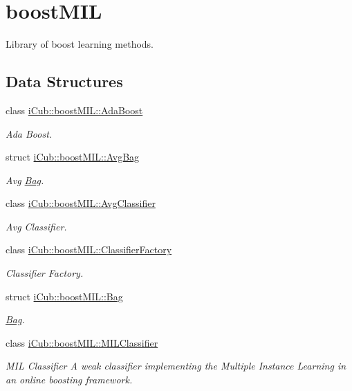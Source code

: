 \section{boost\+M\+I\+L}
\label{group__boostMIL}


Library of boost learning methods.  


\subsection*{Data Structures}
\begin{DoxyCompactItemize}
\item 
class \hyperlink{classiCub_1_1boostMIL_1_1AdaBoost}{i\+Cub\+::boost\+M\+I\+L\+::\+Ada\+Boost}
\begin{DoxyCompactList}\small\item\em Ada Boost. \end{DoxyCompactList}\item 
struct \hyperlink{structiCub_1_1boostMIL_1_1AvgBag}{i\+Cub\+::boost\+M\+I\+L\+::\+Avg\+Bag}
\begin{DoxyCompactList}\small\item\em Avg \hyperlink{structiCub_1_1boostMIL_1_1Bag}{Bag}. \end{DoxyCompactList}\item 
class \hyperlink{classiCub_1_1boostMIL_1_1AvgClassifier}{i\+Cub\+::boost\+M\+I\+L\+::\+Avg\+Classifier}
\begin{DoxyCompactList}\small\item\em Avg Classifier. \end{DoxyCompactList}\item 
class \hyperlink{classiCub_1_1boostMIL_1_1ClassifierFactory}{i\+Cub\+::boost\+M\+I\+L\+::\+Classifier\+Factory}
\begin{DoxyCompactList}\small\item\em Classifier Factory. \end{DoxyCompactList}\item 
struct \hyperlink{structiCub_1_1boostMIL_1_1Bag}{i\+Cub\+::boost\+M\+I\+L\+::\+Bag}
\begin{DoxyCompactList}\small\item\em \hyperlink{structiCub_1_1boostMIL_1_1Bag}{Bag}. \end{DoxyCompactList}\item 
class \hyperlink{classiCub_1_1boostMIL_1_1MILClassifier}{i\+Cub\+::boost\+M\+I\+L\+::\+M\+I\+L\+Classifier}
\begin{DoxyCompactList}\small\item\em M\+I\+L Classifier A weak classifier implementing the Multiple Instance Learning in an online boosting framework. \end{DoxyCompactList}\item 

\end{DoxyCompactItemize}
